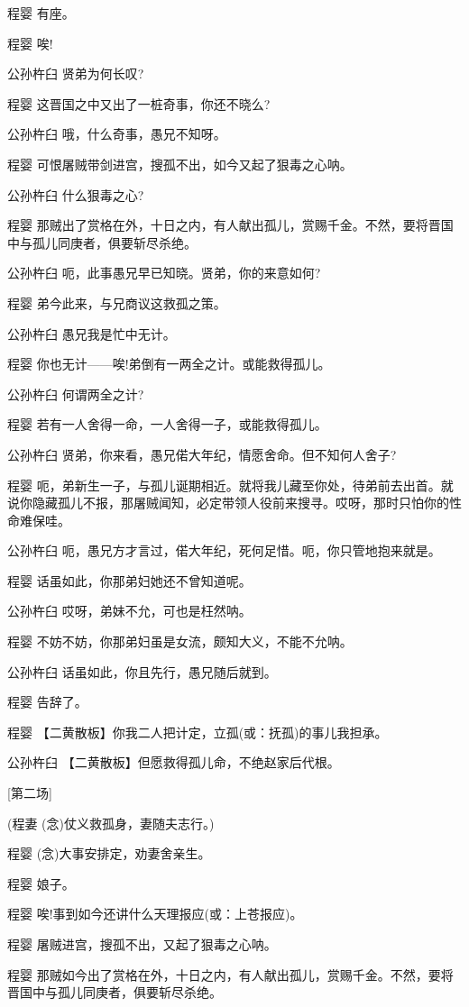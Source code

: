 程婴 有座。

程婴 唉!

公孙杵臼 贤弟为何长叹?

程婴 这晋国之中又出了一桩奇事，你还不晓么?

公孙杵臼 哦，什么奇事，愚兄不知呀。

程婴 可恨屠贼带剑进宫，搜孤不出，如今又起了狠毒之心呐。

公孙杵臼 什么狠毒之心?

程婴
那贼出了赏格在外，十日之内，有人献出孤儿，赏赐千金。不然，要将晋国中与孤儿同庚者，俱要斩尽杀绝。

公孙杵臼 呃，此事愚兄早已知晓。贤弟，你的来意如何?

程婴 弟今此来，与兄商议这救孤之策。

公孙杵臼 愚兄我是忙中无计。

程婴 你也无计------唉!弟倒有一两全之计。或能救得孤儿。

公孙杵臼 何谓两全之计?

程婴 若有一人舍得一命，一人舍得一子，或能救得孤儿。

公孙杵臼 贤弟，你来看，愚兄偌大年纪，情愿舍命。但不知何人舍子?

程婴
呃，弟新生一子，与孤儿诞期相近。就将我儿藏至你处，待弟前去出首。就说你隐藏孤儿不报，那屠贼闻知，必定带领人役前来搜寻。哎呀，那时只怕你的性命难保哇。

公孙杵臼 呃，愚兄方才言过，偌大年纪，死何足惜。呃，你只管地抱来就是。

程婴 话虽如此，你那弟妇她还不曾知道呢。

公孙杵臼 哎呀，弟妹不允，可也是枉然呐。

程婴 不妨不妨，你那弟妇虽是女流，颇知大义，不能不允呐。

公孙杵臼 话虽如此，你且先行，愚兄随后就到。

程婴 告辞了。

程婴 【二黄散板】你我二人把计定，立孤(或：抚孤)的事儿我担承。

公孙杵臼 【二黄散板】但愿救得孤儿命，不绝赵家后代根。

{[}第二场{]}

(程妻 (念)仗义救孤身，妻随夫志行。)

程婴 (念)大事安排定，劝妻舍亲生。

程婴 娘子。

程婴 唉!事到如今还讲什么天理报应(或：上苍报应)。

程婴 屠贼进宫，搜孤不出，又起了狠毒之心呐。

程婴
那贼如今出了赏格在外，十日之内，有人献出孤儿，赏赐千金。不然，要将晋国中与孤儿同庚者，俱要斩尽杀绝。

